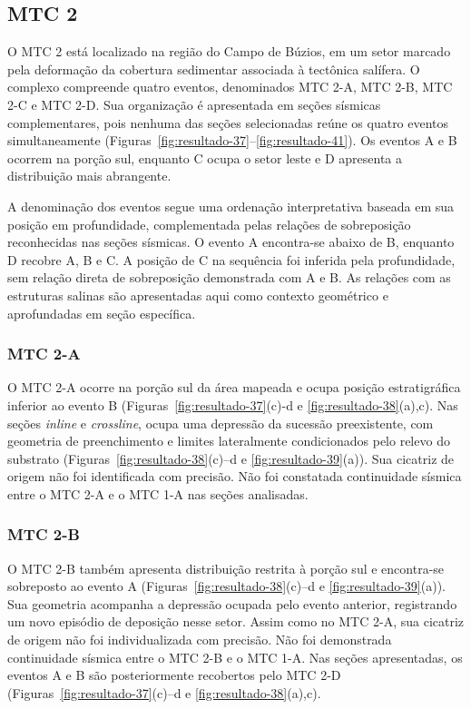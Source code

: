 \subsection{MTC 2}\label{sec:5-1-5}

O MTC 2 está localizado na região do Campo de Búzios, em um setor marcado pela deformação da cobertura sedimentar associada à tectônica salífera. O complexo compreende quatro eventos, denominados MTC 2-A, MTC 2-B, MTC 2-C e MTC 2-D. Sua organização é apresentada em seções sísmicas complementares, pois nenhuma das seções selecionadas reúne os quatro eventos simultaneamente (Figuras~\ref{fig:resultado-37}--\ref{fig:resultado-41}). Os eventos A e B ocorrem na porção sul, enquanto C ocupa o setor leste e D apresenta a distribuição mais abrangente.

A denominação dos eventos segue uma ordenação interpretativa baseada em sua posição em profundidade, complementada pelas relações de sobreposição reconhecidas nas seções sísmicas. O evento A encontra-se abaixo de B, enquanto D recobre A, B e C. A posição de C na sequência foi inferida pela profundidade, sem relação direta de sobreposição demonstrada com A e B. As relações com as estruturas salinas são apresentadas aqui como contexto geométrico e aprofundadas em seção específica.

\subsubsection{MTC 2-A}\label{sec:5-1-5-1}

O MTC 2-A ocorre na porção sul da área mapeada e ocupa posição estratigráfica inferior ao evento B (Figuras~\ref{fig:resultado-37}(c)-d e \ref{fig:resultado-38}(a),c). Nas seções \textit{inline} e \textit{crossline}, ocupa uma depressão da sucessão preexistente, com geometria de preenchimento e limites lateralmente condicionados pelo relevo do substrato (Figuras~\ref{fig:resultado-38}(c)--d e \ref{fig:resultado-39}(a)). Sua cicatriz de origem não foi identificada com precisão. Não foi constatada continuidade sísmica entre o MTC 2-A e o MTC 1-A nas seções analisadas.

\subsubsection{MTC 2-B}\label{sec:5-1-5-2}

O MTC 2-B também apresenta distribuição restrita à porção sul e encontra-se sobreposto ao evento A (Figuras~\ref{fig:resultado-38}(c)--d e \ref{fig:resultado-39}(a)). Sua geometria acompanha a depressão ocupada pelo evento anterior, registrando um novo episódio de deposição nesse setor. Assim como no MTC 2-A, sua cicatriz de origem não foi individualizada com precisão. Não foi demonstrada continuidade sísmica entre o MTC 2-B e o MTC 1-A. Nas seções apresentadas, os eventos A e B são posteriormente recobertos pelo MTC 2-D (Figuras~\ref{fig:resultado-37}(c)--d e \ref{fig:resultado-38}(a),c).

